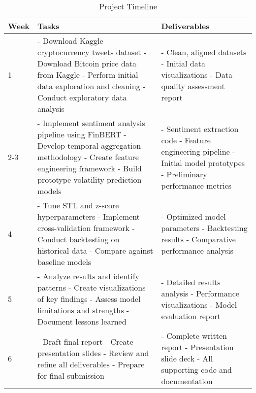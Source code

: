 \documentclass[11pt,twocolumn]{article}
\begin{document}
\begin{table}[h]
\caption{Project Timeline}
\label{tab:timeline}
\centering
\begin{tabular}{|p{0.5cm}|p{3.5cm}|p{3.5cm}|}
\hline
Week & Tasks & Deliverables \\
\hline
1 & - Download Kaggle cryptocurrency tweets dataset\newline
- Download Bitcoin price data from Kaggle\newline
- Perform initial data exploration and cleaning\newline
- Conduct exploratory data analysis & - Clean, aligned datasets\newline
- Initial data visualizations\newline
- Data quality assessment report \\
\hline
2-3 & - Implement sentiment analysis pipeline using FinBERT\newline
- Develop temporal aggregation methodology\newline
- Create feature engineering framework\newline
- Build prototype volatility prediction models & - Sentiment extraction code\newline
- Feature engineering pipeline\newline
- Initial model prototypes\newline
- Preliminary performance metrics \\
\hline
4 & - Tune STL and z-score hyperparameters\newline
- Implement cross-validation framework\newline
- Conduct backtesting on historical data\newline
- Compare against baseline models & - Optimized model parameters\newline
- Backtesting results\newline
- Comparative performance analysis \\
\hline
5 & - Analyze results and identify patterns\newline
- Create visualizations of key findings\newline
- Assess model limitations and strengths\newline
- Document lessons learned & - Detailed results analysis\newline
- Performance visualizations\newline
- Model evaluation report \\
\hline
6 & - Draft final report\newline
- Create presentation slides\newline
- Review and refine all deliverables\newline
- Prepare for final submission & - Complete written report\newline
- Presentation slide deck\newline
- All supporting code and documentation \\
\hline
\end{tabular}
\end{table}
\end{document}

